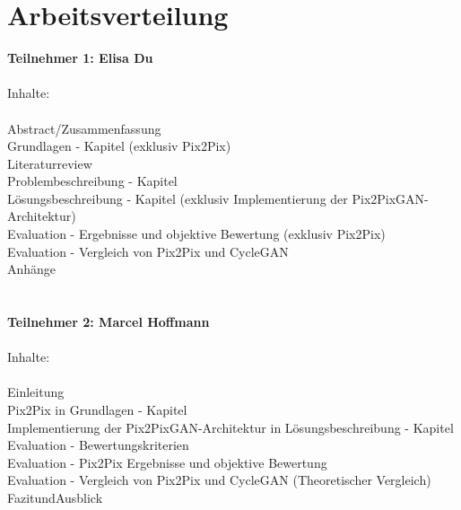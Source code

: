 \chapter*{Arbeitsverteilung}

\textbf{Teilnehmer 1:  Elisa Du} \\
\\
 Inhalte: \\
\\ Abstract/Zusammenfassung
\\ Grundlagen - Kapitel (exklusiv Pix2Pix)
\\ Literaturreview
\\ Problembeschreibung - Kapitel
\\ Lösungsbeschreibung - Kapitel (exklusiv Implementierung der Pix2PixGAN-Architektur)
\\ Evaluation - Ergebnisse und objektive Bewertung  (exklusiv Pix2Pix)
\\ Evaluation - Vergleich von Pix2Pix und CycleGAN
\\ Anhänge
\\ 
\\
\\
\textbf{Teilnehmer 2: Marcel Hoffmann} \\
\\
 Inhalte: \\
\\ Einleitung
\\ Pix2Pix in Grundlagen - Kapitel
\\ Implementierung der Pix2PixGAN-Architektur in Lösungsbeschreibung - Kapitel
\\ Evaluation - Bewertungskriterien
\\ Evaluation - Pix2Pix Ergebnisse und objektive Bewertung
\\ Evaluation - Vergleich von Pix2Pix und CycleGAN (Theoretischer Vergleich)
\\ FazitundAusblick
\\
\\
\\
